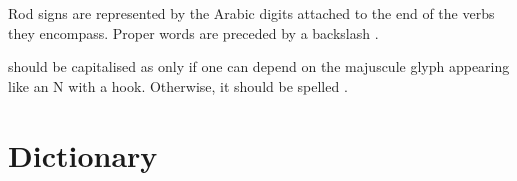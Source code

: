 \documentclass{book}
\begin{document}
Rod signs are represented by the Arabic digits  attached to the end of the verbs they encompass. Proper words are preceded by a backslash \ortho{\bs{}}.

 should be capitalised as  only if one can depend on the majuscule glyph appearing like an N with a hook. Otherwise, it should be spelled .

\chapter{Dictionary}

\begin{multicols}{2}
    
\end{multicols}
\end{document}
